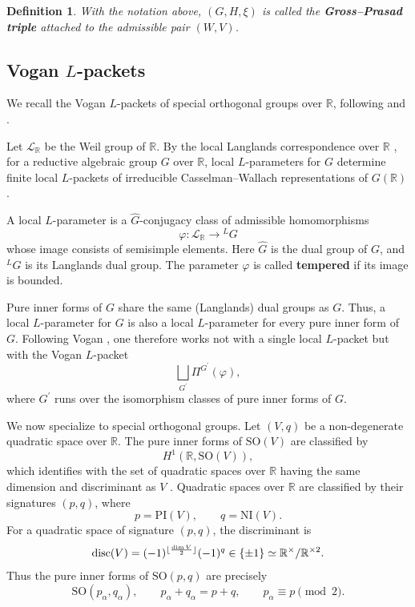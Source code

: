 \documentclass[12pt]{amsart}
\numberwithin{equation}{subsection}
\newcommand{\BR}{{\mathbb {R}}}
\newcommand{\CL}{{\mathcal {L}}}
\newcommand{\disc}{{\mathrm{disc }}}
\newcommand{\SO}{{\mathrm{SO}}}
\newcommand{\wh}{\widehat}
\def\alp{{\alpha}}
\def\LG{{}^{L}G}
\def\vphi{\varphi}
\def\p{\prime}
\def\PI{\mathrm{PI}}
\def\NI{\mathrm{NI}}
\def\SO{\mathrm{SO}}
\newtheorem{defin}[thm]{Definition}
\DeclarePairedDelimiter{\floor}{\lfloor}{\rfloor}
\begin{document}
\begin{defin}\label{defin:ggptriple}
With the notation above, $(G,H,\xi)$ is called the \textbf{Gross--Prasad triple}
attached to the admissible pair $(W,V)$.
\end{defin}

\subsection{\texorpdfstring{Vogan $L$-packets}{Vogan L-packets}}\label{subsec:vgLpacket}

We recall the Vogan $L$-packets of special orthogonal groups over $\BR$,
following \cite[\S 3]{MR1186476} and \cite{MR1216197}.

Let $\CL_\BR$ be the Weil group of $\BR$. By the local Langlands correspondence
over $\BR$ \cite{langlandsclassify}, for a reductive algebraic group $G$ over
$\BR$, local $L$-parameters for $G$ determine finite local $L$-packets of
irreducible Casselman--Wallach representations of $G(\BR)$
\cite{MR1013462,MR1170566}. 

A local $L$-parameter is a $\wh{G}$-conjugacy class
of admissible homomorphisms
\[
\vphi:\CL_\BR\to \LG
\]
whose image consists of semisimple elements. Here $\wh{G}$ is the dual group of
$G$, and $\LG$ is its Langlands dual group. The parameter $\vphi$ is called
\textbf{tempered} if its image is bounded.

Pure inner forms of $G$ share the same (Langlands) dual groups as $G$. Thus, a local $L$-parameter for $G$ is also a local $L$-parameter for every pure
inner form of $G$. Following Vogan \cite{MR1216197}, one therefore works not
with a single local $L$-packet but with the Vogan $L$-packet
\[
\bigsqcup_{G^\p}\Pi^{G^\p}(\vphi),
\]
where $G^\p$ runs over the isomorphism classes of pure inner forms of $G$.

We now specialize to special orthogonal groups. Let $(V,q)$ be a
non-degenerate quadratic space over $\BR$. The pure inner forms of $\SO(V)$ are
classified by
\[
H^1(\BR,\SO(V)),
\]
which identifies with the set of quadratic spaces over $\BR$ having the same
dimension and discriminant as $V$ \cite[\S 8]{MR1295124}. Quadratic spaces over
$\BR$ are classified by their signatures $(p,q)$, where
\[
p=\PI(V),\qquad q=\NI(V).
\]
For a quadratic space of signature $(p,q)$, the discriminant is
\begin{equation}\label{eq:discriminantdef}
\disc(V)=(-1)^{\floor{\frac{\dim V}{2}}}(-1)^q
\in \{\pm 1\}\simeq \BR^\times/\BR^{\times 2}.
\end{equation}
Thus the pure inner forms of $\SO(p,q)$ are precisely
\begin{equation}\label{eq:pureinnerofSOpq}
\SO(p_\alp,q_\alp),
\qquad
p_\alp+q_\alp=p+q,\qquad
p_\alp\equiv p\pmod{2}.
\end{equation}
\end{document}
